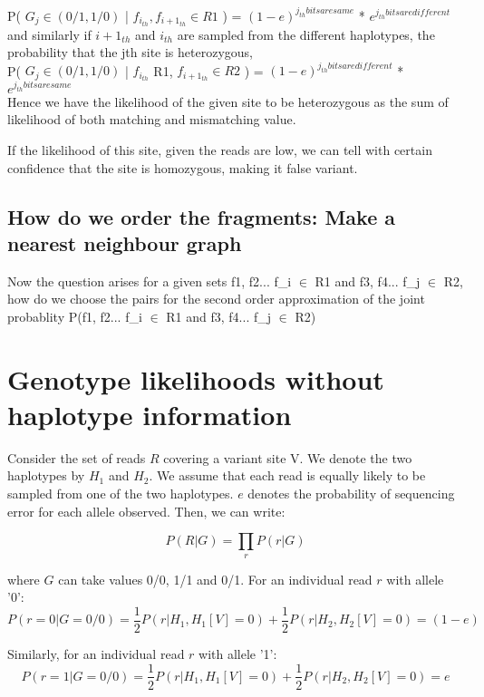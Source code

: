 \documentclass[9pt]{osa-supplemental-document}
\begin{document}
P( $G_j \in (0/1, 1/0) $ | $f_{i_{th}}, f_{i+1_{th}} \in R1$ ) = $(1-e)^{j_{th} bits are same}$ * $e^{j_{th} bits are different}$ \\

and similarly if $i+1_{th}$ and $i_{th}$ are sampled from the different haplotypes, the probability that the jth site is heterozygous,  \\

P( $G_j \in (0/1, 1/0) $ | $f_{i_{th}}$ \in R1, $f_{i+1_{th}} \in R2$ ) = $(1-e)^{j_{th} bits are different}$ * $e^{j_{th} bits are same}$\\

Hence we have the likelihood of the given site to be heterozygous as 
the sum of likelihood of both matching and mismatching value.

If the likelihood of this site, given the reads are low, we can tell with certain confidence that the site is homozygous, making it false variant.

\subsection{How do we order the fragments: Make a nearest neighbour graph}


Now the question arises for a given sets {f1, f2... f_{i}} $\in$ R1 and {f3, f4... f_{j}} $\in$ R2, how do we choose the pairs for the second order approximation of the joint probablity P({f1, f2... f_{i}} $\in$ R1 and {f3, f4... f_{j}} $\in$ R2)


\clearpage
\section{Genotype likelihoods without haplotype information}
Consider the set of reads $R$ covering a variant site V. We denote the two haplotypes by $H_1$ and $H_2$. We assume that each read is equally likely to be sampled from one of the two haplotypes. $e$ denotes the probability of sequencing error for each allele observed. Then, we can write:

\[ P(R|G) = \prod_r P(r|G) \]

where $G$ can take values 0/0, 1/1 and 0/1. For an individual read $r$ with allele '0':
\[ P(r=0|G=0/0) = \frac{1}{2}P(r|H_1,H_1[V]=0) +  \frac{1}{2}P(r|H_2,H_2[V]=0) = (1-e) \]


Similarly, for an individual read $r$ with allele '1':
\[ P(r=1|G=0/0) = \frac{1}{2}P(r|H_1,H_1[V]=0) +  \frac{1}{2}P(r|H_2,H_2[V]=0) = e \]
\end{document}
